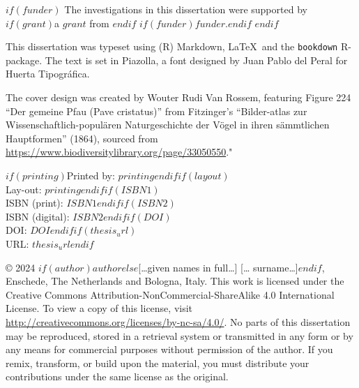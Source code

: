 \documentclass[$if(fontsize)$$fontsize$,$endif$$if(papersize)$$papersize$paper,twoside,$endif$$for(classoption)$$classoption$$sep$,$endfor$]{$documentclass$} %
\begin{document}
\vspace*{\fill}
\begingroup %
\small
\setlength{\parskip}{\baselineskip} %
\setlength\parindent{0pt} %
$if(funder)$
The investigations in this dissertation were supported by $if(grant)$a $grant$ from $endif$
$if(funder)$$funder$.$endif$
$endif$

This dissertation was typeset using (R) Markdown, \LaTeX\ and the \verb+bookdown+ R-package. The text is set in Piazolla, a font designed by Juan Pablo del Peral for Huerta Tipográfica.

The cover design was created by Wouter Rudi Van Rossem, featuring Figure 224 “Der gemeine Pfau (Pave cristatus)” from Fitzinger’s “Bilder-atlas zur Wissenschaftlich-populären Naturgeschichte der Vögel in ihren sämmtlichen Hauptformen” (1864), sourced from \url{https://www.biodiversitylibrary.org/page/33050550}."

$if(printing)$Printed by: $printing$$endif$$if(layout)$\\ Lay-out: $printing$$endif$$if(ISBN1)$\\ ISBN (print): $ISBN1$$endif$$if(ISBN2)$\\ ISBN (digital): $ISBN2$$endif$$if(DOI)$\\ DOI: $DOI$$endif$$if(thesis_url)$\\ URL: $thesis_url$$endif$


© 2024 $if(author)$$author$$else$[…given names in full…] [… surname…]$endif$, Enschede, The Netherlands and Bologna, Italy. This work is licensed under the Creative Commons Attribution-NonCommercial-ShareAlike 4.0 International License. To view a copy of this license, visit \url{http://creativecommons.org/licenses/by-nc-sa/4.0/}. No parts of this dissertation may be reproduced, stored in a retrieval system or transmitted in any form or by any means for commercial purposes without permission of the author. If you remix, transform, or build upon the material, you must distribute your contributions under the same license as the original.
\endgroup


\clearpage
\thispagestyle{empty}
\noindent
\end{document}
